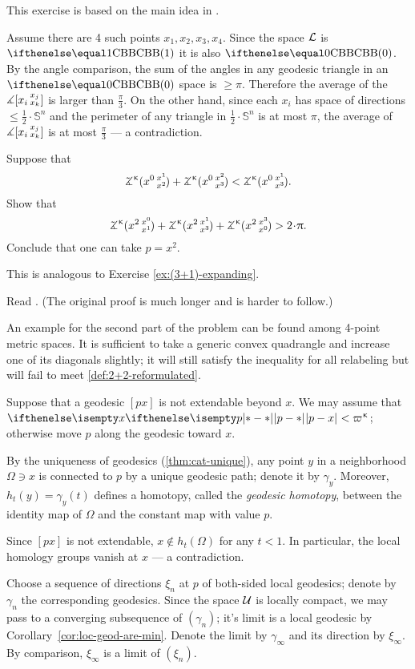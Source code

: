 This exercise is based on the main idea in \cite{hsiang-kleiner}.

\medskip

Assume there are 4 such points $x_1,x_2,x_3,x_4$.
Since the space $\mathcal{L}$ is $\Alex{1}$ it is also $\Alex{0}$.
By the angle comparison, the sum of the angles in any geodesic triangle in an $\Alex{0}$ space is $\ge \pi$.
Therefore the average of the $\measuredangle[x_i\,{}^{x_j}_{x_k}]$ is  larger than $\tfrac\pi3$.
On the other hand, since each $x_i$ has space of directions $\le\tfrac12\cdot\mathbb{S}^n$ and the perimeter of any triangle in $\tfrac12\cdot\mathbb{S}^n$ is at most $\pi$, the average of $\measuredangle[x_i\,{}^{x_j}_{x_k}]$ is at most $\tfrac\pi3$ --- a contradiction.


Suppose that 
\[\angk\kappa {x^0}{x^1}{x^2}+\angk\kappa {x^0}{x^2}{x^3}<\angk\kappa {x^0}{x^1}{x^3}.\]
Show that
\[\angk\kappa {x^2}{x^0}{x^1}+\angk\kappa {x^2}{x^1}{x^3}+\angk\kappa {x^2}{x^3}{x^0}>2\cdot\pi.\]
Conclude that one can take $p=x^2$.

This is analogous to Exercise \ref{ex:(3+1)-expanding}.

Read \cite{sato}.
(The original proof \cite{berg-nikolaev} is much longer and is harder to follow.)

An example for the second part of the problem can be found among 4-point metric spaces.
It is sufficient to take a generic convex quadrangle and increase one of its diagonals slightly;
it will still satisfy the inequality for all relabeling but will fail to meet \ref{def:2+2-reformulated}.

Suppose that a geodesic $[px]$ is not extendable beyond $x$.
We may assume that $\dist{p}{x}{}<\varpi\kappa$;
otherwise move $p$ along the geodesic toward  $x$.

By the uniqueness of geodesics (\ref{thm:cat-unique}), any point $y$ in a neighborhood $\Omega\ni x$ is connected to $p$ by a unique geodesic path; denote it by $\gamma_y$.
Moreover, $h_t(y)=\gamma_y(t)$ defines a homotopy, called the  \emph{geodesic homotopy}, between the identity map of $\Omega$ and the constant map with value $p$.

Since $[px]$ is not extendable, $x\notin h_t(\Omega)$ for any $t<1$.
In particular, the local homology groups vanish at $x$ --- a contradiction.

 Choose a sequence of 
directions $\xi_n$ at $p$
of both-sided local geodesics; denote by $\gamma_n$ the corresponding geodesics.
Since the space $\mathcal{U}$ is locally compact, we may pass to a converging subsequence of $(\gamma_n)$; it's limit is a local geodesic by Corollary~\ref{cor:loc-geod-are-min}.
Denote the limit by  $\gamma_\infty$ and its direction by $\xi_\infty$.
By comparison, $\xi_\infty$ is a limit of $(\xi_n)$.

